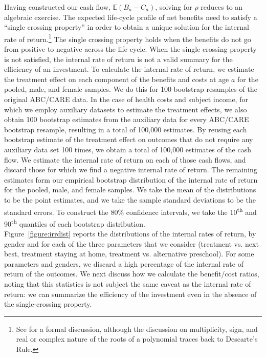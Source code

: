 \noindent Having constructed our cash flow, $\mathbb{E} (B_a - C_a)$, solving for $\rho$ reduces to an algebraic exercise. The expected life-cycle profile of net benefits need to satisfy a ``single crossing property'' in order to obtain a unique solution for the internal rate of return.\footnote{See \citet{Arrow-Levhari_1969_EJ} for a formal discussion, although the discussion on multiplicity, sign, and real or complex nature of the roots of a polynomial traces back to Descarte's Rule.} The single crossing property holds when the benefits do not go from positive to negative across the life cycle. When the single crossing property is not satisfied, the internal rate of return is not a valid summary for the efficiency of an investment. To calculate the internal rate of return, we estimate the treatment effect on each component of the benefits and costs at age $a$ for the pooled, male, and female samples. We do this for 100 bootstrap resamples of the original ABC/CARE data. In the case of health costs and subject income, for which we employ auxiliary datasets to estimate the treatment effects, we also obtain 100 bootstrap estimates from the auxiliary data for every ABC/CARE bootstrap resample, resulting in a total of 100,000 estimates. By reusing each bootstrap estimate of the treatment effect on outcomes that do not require any auxiliary data set 100 times, we obtain a total of 100,000 estimates of the cash flow. We estimate the internal rate of return on each of those cash flows, and discard those for which we find a negative internal rate of return. The remaining estimates form our empirical bootstrap distribution of the internal rate of return for the pooled, male, and female samples. We take the mean of the distributions to be the point estimates, and we take the sample standard deviations to be the standard errors. To construct the 80\% confidence intervals, we take the 10\textsuperscript{th} and 90\textsuperscript{th} quantiles of each bootstrap distribution.\\

\noindent Figure~\ref{figure:irrdist} reports the distributions of the internal rates of return, by gender and for each of the three parameters that we consider (treatment vs. next best, treatment staying at home, treatment vs. alternative preschool). For some parameters and genders, we discard a high percentage of the internal rate of return of the outcomes. We next discuss how we calculate the benefit/cost ratios, noting that this statistics is not subject the same caveat as the internal rate of return: we can summarize the efficiency of the investment even in the absence of the single-crossing property.

